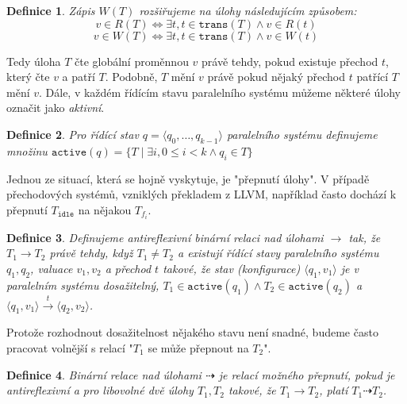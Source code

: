 \documentclass[10pt,a4paper,notitlepage]{report}
\newtheorem{definition}{Definice}
\newcommand{\tuple}[1]{\langle #1 \rangle}
\newcommand{\suchthat}{\mid}
\begin{document}
\begin{definition}
Zápis $W(T)$ rozšiřujeme na úlohy následujícím způsobem:
\begin{equation*}
v \in R(T) \Leftrightarrow \exists t, t \in \texttt{trans}(T) \land v \in R(t)
\end{equation*}
\begin{equation*}
v \in W(T) \Leftrightarrow \exists t, t \in \texttt{trans}(T) \land v \in W(t)
\end{equation*}
\end{definition}
Tedy úloha $T$ čte globální proměnnou $v$ právě tehdy, pokud existuje přechod $t$, který čte $v$ a patří $T$. Podobně, $T$ mění $v$ právě pokud nějaký přechod $t$ patřící $T$ mění $v$.
Dále, v každém řídícím stavu paralelního systému můžeme některé úlohy označit jako \textit{aktivní}.
\begin{definition}
Pro řídící stav $q = \tuple{q_0, \ldots, q_{k-1}}$ paralelního systému definujeme množinu $\texttt{active}(q) = \{ T \suchthat \exists i, 0 \leq i < k \land q_i \in T \}$
\end{definition}

Jednou ze situací, která se hojně vyskytuje, je "přepnutí úlohy". V případě přechodových systémů, vzniklých překladem z LLVM, například často dochází k přepnutí $T_\texttt{idle}$ na nějakou $T_{f_i}$. 

\newcommand{\switchto}{\rightarrow}
\newcommand{\canswitchto}{\dashrightarrow}

\begin{definition}
Definujeme antireflexivní binární relaci nad úlohami $\switchto$ tak, že $T_1 \switchto T_2$ právě tehdy, když $T_1 \neq T_2$ a existují řídící stavy paralelního systému $q_1, q_2$, valuace $v_1, v_2$ a přechod $t$ takové, že stav (konfigurace) $\tuple{q_1, v_1}$ je v paralelním systému dosažitelný, $T_1 \in \texttt{active}(q_1) \land T_2 \in \texttt{active}(q_2)$ a $\tuple{q_1, v_1} \xrightarrow{t} \tuple{q_2, v_2}$.
\end{definition}

Protože rozhodnout dosažitelnost nějakého stavu není snadné, budeme často pracovat volnější s relací "$T_1$ se může přepnout na $T_2$".

\begin{definition}
Binární relace nad úlohami $\canswitchto$ je relací možného přepnutí, pokud je antireflexivní a pro libovolné dvě úlohy $T_1, T_2$ takové, že $T_1 \switchto T_2$, platí $T_1 \canswitchto T_2$.
\end{definition}
\end{document}
